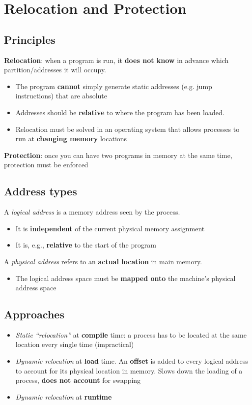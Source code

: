\documentclass{article}
\begin{document}
\section{Relocation and Protection}
\subsection{Principles}
\begin{flushleft}
\textbf{Relocation}: when a program is run, it \textbf{does not know} in advance which partition/addresses it will occupy.
\begin{itemize}
	\item The program \textbf{cannot} simply generate static addresses (e.g. jump instructions) that are absolute
	\item Addresses should be \textbf{relative} to where the program has been loaded.
	\item Relocation must be solved in an operating system that allows processes to run at \textbf{changing memory} locations
\end{itemize}
\textbf{Protection}: once you can have two programs in memory at the same time, protection must be enforced
\end{flushleft}

\subsection{Address types}
\begin{flushleft}
A \textit{logical address} is a memory address seen by the process.
\begin{itemize}
	\item It is \textbf{independent} of the current physical memory assignment
	\item It is, e.g., \textbf{relative} to the start of the program 
\end{itemize}
A \textit{physical address} refers to an \textbf{actual location} in main memory.
\begin{itemize}
	\item The logical address space must be \textbf{mapped onto} the machine’s physical address space
\end{itemize}
\end{flushleft}

\subsection{Approaches}
\begin{itemize}
	\item \textit{Static “relocation”} at \textbf{compile} time: a process has to be located at the same location every single time (impractical)
	\item \textit{Dynamic relocation} at \textbf{load} time. An \textbf{offset} is added to every logical address to account for its physical location in memory. Slows down the loading of a process, \textbf{does not account} for swapping
	\item \textit{Dynamic relocation} at \textbf{runtime}
\end{itemize}
\end{document}
